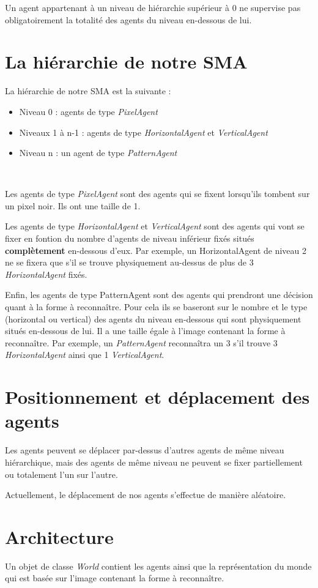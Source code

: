 \documentclass[a4paper,12pt]{report}
\begin{document}
Un agent appartenant à un niveau de hiérarchie supérieur à 0 ne supervise pas obligatoirement la totalité des agents du niveau en-dessous de lui.

\section{La hiérarchie de notre SMA}
La hiérarchie de notre SMA est la suivante :
\begin{itemize}
 \item Niveau 0 : agents de type \emph{PixelAgent}
 \item Niveaux 1 à n-1 : agents de type \emph{HorizontalAgent} et \emph{VerticalAgent}
 \item Niveau n : un agent de type \emph{PatternAgent}
\end{itemize}

~

Les agents de type \emph{PixelAgent} sont des agents qui se fixent lorsqu'ils tombent sur un pixel noir. Ils ont une taille de 1.

Les agents de type \emph{HorizontalAgent} et \emph{VerticalAgent} sont des agents qui vont se fixer en fontion du nombre d'agents de niveau inférieur fixés situés \textbf{complètement} en-dessous d'eux. Par exemple, un HorizontalAgent de niveau 2 ne se fixera que s'il se trouve physiquement au-dessus de plus de 3 \emph{HorizontalAgent} fixés.

Enfin, les agents de type PatternAgent sont des agents qui prendront une décision quant à la forme à reconnaître. Pour cela ils se baseront sur le nombre et le type (horizontal ou vertical) des agents du niveau en-dessous qui sont physiquement situés en-dessous de lui. Il a une taille égale à l'image contenant la forme à reconnaître. Par exemple, un \emph{PatternAgent} reconnaîtra un 3 s'il trouve 3 \emph{HorizontalAgent} ainsi que 1 \emph{VerticalAgent}.

\section{Positionnement et déplacement des agents}
Les agents peuvent se déplacer par-dessus d'autres agents de même niveau hiérarchique, mais des agents de même niveau ne peuvent se fixer partiellement ou totalement l'un sur l'autre.

Actuellement, le déplacement de nos agents s'effectue de manière aléatoire.

\section{Architecture}
Un objet de classe \emph{World} contient les agents ainsi que la représentation du monde qui est basée sur l'image contenant la forme à reconnaître.
\end{document}
